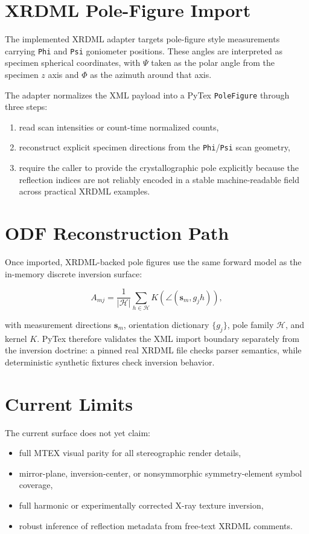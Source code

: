 \documentclass[11pt]{article}
\begin{document}
\section{XRDML Pole-Figure Import}

The implemented XRDML adapter targets pole-figure style measurements carrying \texttt{Phi} and \texttt{Psi} goniometer positions. These angles are interpreted as specimen spherical coordinates, with $\Psi$ taken as the polar angle from the specimen $z$ axis and $\Phi$ as the azimuth around that axis.

The adapter normalizes the XML payload into a PyTex \texttt{PoleFigure} through three steps:

\begin{enumerate}
  \item read scan intensities or count-time normalized counts,
  \item reconstruct explicit specimen directions from the \texttt{Phi}/\texttt{Psi} scan geometry,
  \item require the caller to provide the crystallographic pole explicitly because the reflection indices are not reliably encoded in a stable machine-readable field across practical XRDML examples.
\end{enumerate}

\section{ODF Reconstruction Path}

Once imported, XRDML-backed pole figures use the same forward model as the in-memory discrete inversion surface:

\[
  A_{mj} = \frac{1}{|\mathcal{H}|}\sum_{h \in \mathcal{H}} K\!\left(\angle(\mathbf{s}_m, g_j h)\right),
\]

with measurement directions $\mathbf{s}_m$, orientation dictionary $\{g_j\}$, pole family $\mathcal{H}$, and kernel $K$. PyTex therefore validates the XML import boundary separately from the inversion doctrine: a pinned real XRDML file checks parser semantics, while deterministic synthetic fixtures check inversion behavior.

\section{Current Limits}

The current surface does not yet claim:

\begin{itemize}
  \item full MTEX visual parity for all stereographic render details,
  \item mirror-plane, inversion-center, or nonsymmorphic symmetry-element symbol coverage,
  \item full harmonic or experimentally corrected X-ray texture inversion,
  \item robust inference of reflection metadata from free-text XRDML comments.
\end{itemize}
\end{document}
